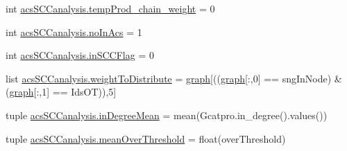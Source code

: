 \begin{DoxyCompactItemize}
\item 
int \hyperlink{a00128_aaf17c99825e0961e4cfaa173ddfffe84}{acs\-S\-C\-Canalysis.\-temp\-Prod\-\_\-chain\-\_\-weight} = 0
\item 
int \hyperlink{a00128_a4766b3ca835449f1aa287fda699c7f96}{acs\-S\-C\-Canalysis.\-no\-In\-Acs} = 1
\item 
int \hyperlink{a00128_a6405b6b05e7b87812422cc30d2034904}{acs\-S\-C\-Canalysis.\-in\-S\-C\-C\-Flag} = 0
\item 
list \hyperlink{a00128_a5162bfbe5eb2618736d1f77bb3125a9b}{acs\-S\-C\-Canalysis.\-weight\-To\-Distribute} = \hyperlink{a00028_a2745e24fec2a44d51f4452beb1596bd3}{graph}\mbox{[}((\hyperlink{a00028_a2745e24fec2a44d51f4452beb1596bd3}{graph}\mbox{[}\-:,0\mbox{]} == sng\-In\-Node) \& (\hyperlink{a00028_a2745e24fec2a44d51f4452beb1596bd3}{graph}\mbox{[}\-:,1\mbox{]} == Ids\-O\-T)),5\mbox{]}
\item 
tuple \hyperlink{a00128_a5004d18b8cfa2803620a9cd7f32d9775}{acs\-S\-C\-Canalysis.\-in\-Degree\-Mean} = mean(Gcatpro.\-in\-\_\-degree().values())
\item 
tuple \hyperlink{a00128_af10c3623be709892f4bdc4df5a3d52b0}{acs\-S\-C\-Canalysis.\-mean\-Over\-Threshold} = float(over\-Threshold)
\end{DoxyCompactItemize}
